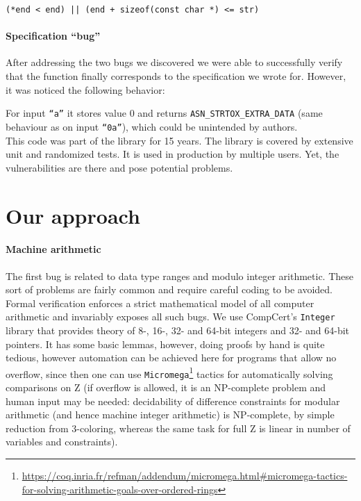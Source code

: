 \documentclass{article}
\begin{document}
{\small
\texttt{(*end < end) || (end + sizeof(const char *) <= str)}}


\paragraph{Specification ``bug''}
After addressing the two bugs we discovered we were able to successfully verify that the function finally corresponds to the specification we wrote for. However, it was noticed the following behavior:

For input \texttt{``a''} it stores value 0 and returns {\color{green}\texttt{ASN\_STRTOX\_EXTRA\_DATA}} (same behaviour as on input \texttt{``0a''}), which could be unintended by authors. \\

This code was part of the library for 15 years. The library is covered by extensive unit and randomized tests. It is used in production by multiple users. Yet, the vulnerabilities are there and pose potential problems.

\section{Our approach}


\paragraph{Machine arithmetic} The first bug is related to data type ranges and modulo integer arithmetic. These sort of problems are fairly common and require careful coding to be avoided. Formal verification enforces a strict mathematical model of all computer arithmetic and invariably exposes all such bugs. We use CompCert's \texttt{Integer} library that provides theory of 8-, 16-, 32- and 64-bit integers and 32- and 64-bit pointers. It has some basic lemmas, however, doing proofs by hand is quite tedious, however automation can be achieved here for programs that allow no overflow, since then one can use \texttt{Micromega}\footnote{\url{https://coq.inria.fr/refman/addendum/micromega.html#micromega-tactics-for-solving-arithmetic-goals-over-ordered-rings}} tactics for automatically solving comparisons on Z (if overflow is allowed, it is an NP-complete problem and human input may be needed: decidability of difference constraints for modular arithmetic (and hence machine integer arithmetic) is NP-complete, by simple reduction from 3-coloring\cite{PointerConstraintsNP}, whereas the same task for full Z is linear in number of variables and constraints).  
\end{document}
